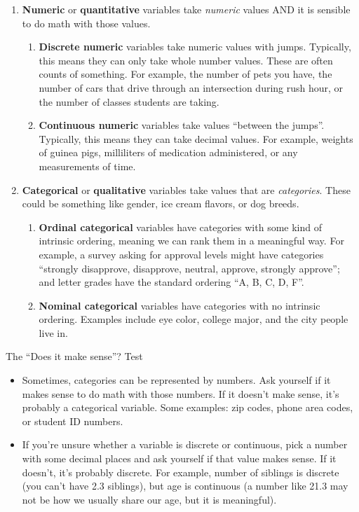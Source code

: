 \documentclass[
]{book}
\providecommand{\tightlist}{%
  \setlength{\itemsep}{0pt}\setlength{\parskip}{0pt}}
\begin{document}
\begin{enumerate}
\def\labelenumi{\arabic{enumi}.}
\tightlist
\item
  \textbf{Numeric} or \textbf{quantitative} variables take \emph{numeric} values AND it is sensible to do math with those values.

  \begin{enumerate}
  \def\labelenumii{\alph{enumii}.}
  \tightlist
  \item
    \textbf{Discrete numeric} variables take numeric values with jumps. Typically, this means they can only take whole number values. These are often counts of something. For example, the number of pets you have, the number of cars that drive through an intersection during rush hour, or the number of classes students are taking.
  \item
    \textbf{Continuous numeric} variables take values ``between the jumps''. Typically, this means they can take decimal values. For example, weights of guinea pigs, milliliters of medication administered, or any measurements of time.
  \end{enumerate}
\item
  \textbf{Categorical} or \textbf{qualitative} variables take values that are \emph{categories}. These could be something like gender, ice cream flavors, or dog breeds.

  \begin{enumerate}
  \def\labelenumii{\alph{enumii}.}
  \tightlist
  \item
    \textbf{Ordinal categorical} variables have categories with some kind of intrinsic ordering, meaning we can rank them in a meaningful way. For example, a survey asking for approval levels might have categories ``strongly disapprove, disapprove, neutral, approve, strongly approve''; and letter grades have the standard ordering ``A, B, C, D, F''.
  \item
    \textbf{Nominal categorical} variables have categories with no intrinsic ordering. Examples include eye color, college major, and the city people live in.
  \end{enumerate}
\end{enumerate}

The ``Does it make sense''? Test

\begin{itemize}
\tightlist
\item
  Sometimes, categories can be represented by numbers. Ask yourself if it makes sense to do math with those numbers. If it doesn't make sense, it's probably a categorical variable. Some examples: zip codes, phone area codes, or student ID numbers.
\item
  If you're unsure whether a variable is discrete or continuous, pick a number with some decimal places and ask yourself if that value makes sense. If it doesn't, it's probably discrete. For example, number of siblings is discrete (you can't have 2.3 siblings), but age is continuous (a number like 21.3 may not be how we usually share our age, but it is meaningful).
\end{itemize}
\end{document}
